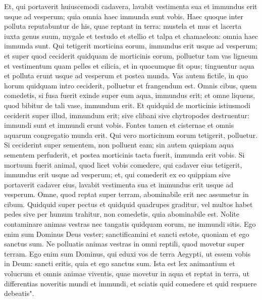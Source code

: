 \begin{biblechapter}
\verse Et, qui portaverit huiuscemodi cadavera, lavabit vestimenta sua et immundus erit usque ad vesperum; quia omnia haec immunda sunt vobis. 
\verse Haec quoque inter polluta reputabuntur de his, quae reptant in terra: mustela et mus et lacerta iuxta genus suum, 
\verse mygale et testudo et stellio et talpa et chamaeleon: 
\verse omnia haec immunda sunt. Qui tetigerit morticina eorum, immundus erit usque ad vesperum; 
\verse et super quod ceciderit quidquam de morticinis eorum, polluetur tam vas ligneum et vestimentum quam pelles et cilicia, et in quocumque fit opus; tinguentur aqua et polluta erunt usque ad vesperum et postea munda. 
\verse Vas autem fictile, in quo horum quidquam intro ceciderit, polluetur et frangendum est. 
\verse Omnis cibus, quem comedetis, si fusa fuerit exinde super eum aqua, immundus erit; et omne liquens, quod bibitur de tali vase, immundum erit. 
\verse Et quidquid de morticinis istiusmodi ceciderit super illud, immundum erit; sive clibani sive chytropodes destruentur: immundi sunt et immundi erunt vobis. 
\verse Fontes tamen et cisternae et omnis aquarum congregatio munda erit. Qui vero morticinum eorum tetigerit, polluetur. 
\verse Si ceciderint super sementem, non polluent eam; 
\verse sin autem quispiam aqua sementem perfuderit, et postea morticinis tacta fuerit, immunda erit vobis. 
\verse Si mortuum fuerit animal, quod licet vobis comedere, qui cadaver eius tetigerit, immundus erit usque ad vesperum; 
\verse et, qui comederit ex eo quippiam sive portaverit cadaver eius, lavabit vestimenta sua et immundus erit usque ad vesperum. 
\verse Omne, quod reptat super terram, abominabile erit nec assumetur in cibum.  
\verse Quidquid super pectus et quidquid quadrupes graditur, vel multos habet pedes sive per humum trahitur, non comedetis, quia abominabile est. 
\verse Nolite contaminare animas vestras nec tangatis quidquam eorum, ne immundi sitis. 
\verse Ego enim sum Dominus Deus vester; sanctificamini et sancti estote, quoniam et ego sanctus sum. Ne polluatis animas vestras in omni reptili, quod movetur super terram. 
\verse Ego enim sum Dominus, qui eduxi vos de terra Aegypti, ut essem vobis in Deum: sancti eritis, quia et ego sanctus sum. 
\verse Ista est lex animantium et volucrum et omnis animae viventis, quae movetur in aqua et reptat in terra, 
\verse ut differentias noveritis mundi et immundi, et sciatis quid comedere et quid respuere debeatis". 
\end{biblechapter}

